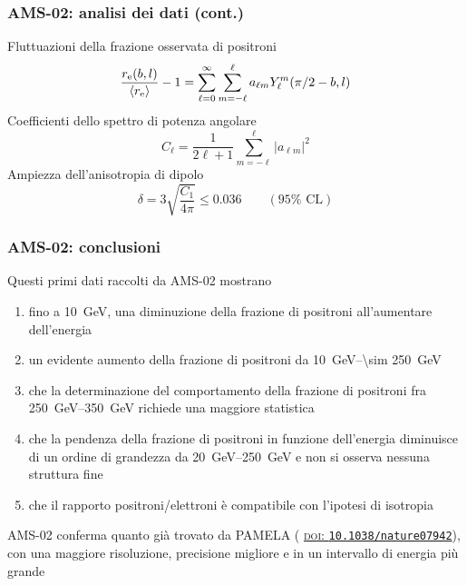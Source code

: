 \documentclass[10pt]{beamer}
\newcommand{\doi}[1]{{\usebeamercolor[fg]{bibliography entry note}
    \href{http://dx.doi.org/#1}{\textsc{doi}: \texttt{#1}}}}
\begin{document}
\begin{frame}
  \frametitle{AMS-02: analisi dei dati (cont.)}
  Fluttuazioni della frazione osservata di positroni
  \begin{equation*}
    \frac{r_{\textup{e}}(b,l)}{\langle r_{\textup{e}}\rangle} - 1 =
    \sum_{\ell=0}^{\infty} \sum_{m=-\ell}^{\ell} a_{\ell m}Y_{\ell}^{m}(\pi/2 -
    b,l)
  \end{equation*}
  Coefficienti dello spettro di potenza angolare
  \begin{equation*}
    C_{\ell} = \frac{1}{2\ell + 1} \sum_{m=-\ell}^{\ell} \lvert a_{\ell m}
    \rvert^{2}
  \end{equation*}
  Ampiezza dell'anisotropia di dipolo
  \begin{equation*}
    \delta = 3 \sqrt{\frac{C_{1}}{4\pi}} \leq 0.036 \qquad (95\% \text{ CL})
  \end{equation*}
\end{frame}

\begin{frame}
  \frametitle{AMS-02: conclusioni}
  Questi \alert{primi dati} raccolti da AMS-02 mostrano
  \begin{enumerate}
  \item fino a \SI{10}{\giga \electronvolt}, una
    \alert{diminuzione della frazione di positroni} all'aumentare dell'energia
  \item un evidente \alert{aumento della frazione di positroni} da
    \SIrange[range-phrase={ fino a }]{10}{\sim 250}{\giga \electronvolt}
  \item che la determinazione del comportamento della frazione di positroni fra
    \SIrange[range-phrase={ e }]{250}{350}{\giga \electronvolt} richiede una
    \alert{maggiore statistica}
  \item che la
    \alert{pendenza della frazione di positroni in funzione dell'energia
      diminuisce}
    di un ordine di grandezza da
    \SIrange[range-phrase={ a }]{20}{250}{\giga \electronvolt} e non si osserva
    \alert{nessuna struttura fine}
  \item che il rapporto positroni/elettroni è compatibile con l'ipotesi di
    isotropia
  \end{enumerate}
  AMS-02 \alert{conferma quanto già trovato da PAMELA}
  (\doi{10.1038/nature07942}), con una maggiore risoluzione, precisione migliore
  e in un intervallo di energia più grande
\end{frame}
\end{document}
